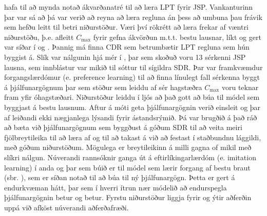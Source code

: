 \documentclass[10pt,a4paper]{article}
\begin{document}
\citet{Siggi05} hafa til að mynda notað ákvarðanatré til að læra LPT fyrir 
JSP. 
Vankanturinn þar var sá að þá var verið að reyna að læra regluna án þess að 
umbuna þau frávik sem hefðu leitt til betri niðurstöður. 
Væri því rökrétt að læra frekar af væntri niðurstöðu, þ.e. afleitt $C_{\max}$ 
fyrir gefna ákvörðun m.t.t. bestu lausnar, líkt og gert var síðar í 
\cite{Malik08,Russell09} og \cite{Siggi10}. Þannig má finna CDR sem betrumbætir 
LPT regluna sem hún byggist á. 
Slík var nálgunin hjá mér í \cite{InRu15a}, þar 
sem skoðuð voru 13 sérkenni JSP lausna, sem innblástur var mikið til sóttur til 
sígildra SDR. Þar var framkvæmdur forgangslærdómur (e. preference learning) 
til að finna línulegt fall sérkenna byggt á þjálfunargögnum þar sem stöður sem 
leiddu af sér hagstæðra $C_{\max}$ voru teknar fram yfir óhagstæðari. 
Niðurstöður leiddu í ljós að það gott að búa til módel sem byggjast á bestu 
lausnum. Aftur á móti geta þjálfunargögnin verið einsleit og þar af leiðandi 
ekki nægjanlega lýsandi fyrir ástandsrýmið. 
Þá var brugðið á það ráð að bæta við þjálfunargögnum sem byggðust á 
góðum SDR til að veita meiri fjölbreytileika til að læra af og til að takast á 
við að festast í staðbundnu lággildi, með góðum niðurstöðum. 
Mögulega er breytileikinn á milli gagna of mikil með slíkri nálgun. 
Núverandi rannsóknir ganga út á eftirlíkingarlærdóm (e. imitation learning) í 
anda \cite{RossB10} og \cite{RossGB11} þar sem búið er til módel sem lærir 
forgang af bestu braut (sbr. \cite{InRu11a,InRu15a}), sem er síðan notað til að 
búa til ný þjálfunargögn. 
Þetta er gert á endurkvæman hátt, þar sem í hverri ítrun nær módelið að 
endurspegla þjálfunargögnin betur og betur. 
Fyrstu niðurstöður liggja fyrir og ýtir aðferðin uppá við afköst núverandi 
aðferðafræði. 

\end{document}
